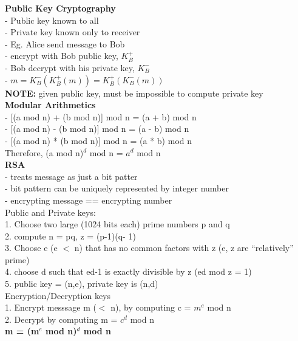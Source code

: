 \documentclass[10pt, a4paper]{article}
\newcommand{\highlight}[1]{{\color{red}\textbf{#1}}}
\newcommand{\blue}[1]{{\color{MidnightBlue}#1}}
\newcommand{\red}[1]{{\color{red}#1}}
\newcommand{\tab}[0]{\hspace*{2mm}}
\begin{document}
\begin{multicols*}{3}
		\textbf{Public Key Cryptography}\\
		- \blue{Public} key known to all\\
		- \blue{Private} key known only to receiver\\
		- Eg. Alice send message to Bob\\
		\tab - encrypt with Bob public key, $K^{+}_{B}$\\
		\tab - Bob decrypt with his private key, $K^{-}_{B}$\\
		\tab - \red{$m = K^{-}_{B}(K^{+}_{B}(m)) = K^{+}_{B}(K^{-}_{B}(m))$}\\
		\highlight{NOTE:} given public key, must be impossible to compute private key\\

		\textbf{Modular Arithmetics}\\
		- [(a mod n) + (b mod n)] mod n = (a + b) mod n\\
		- [(a mod n) - (b mod n)] mod n = (a - b) mod n\\
		- [(a mod n) * (b mod n)] mod n = (a * b) mod n\\
		Therefore, (a mod n)$^{d}$ mod n = $a^{d}$ mod n\\

		\textbf{RSA}\\
		- treats message as just a bit patter\\
		- bit pattern can be uniquely represented by integer number\\
		- encrypting message == encrypting number\\

		Public and Private keys:\\
		1. Choose two large (1024 bits each) prime numbers p and q\\
		2. compute n = pq, z = (p-1)(q- 1)\\
		3. Choose e (e $<$ n) that has no common factors with z (e, z are ``relatively'' prime)\\
		4. choose d such that ed-1 is exactly divisible by z (ed mod z = 1)\\
		5. public key = (n,e), private key is (n,d)\\

		Encryption/Decryption keys\\
		1. Encrypt messsage m ($<$ n), by computing c = $m^{e}$ mod n\\
		2. Decrypt by computing m = $c^{d}$ mod n\\
		\highlight{m = (m$^{e}$ mod n)$^{d}$ mod n}\\


\end{multicols*}
\end{document}
